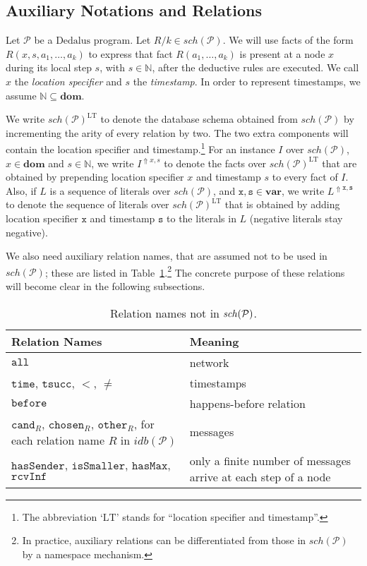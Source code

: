 \documentclass{tlp}
\newcommand{\langname}[1]{\text{#1}}  \newcommand{\pred}[1]{\mathtt{#1}}  \newcommand{\fname}[1]{\mathit{#1}}  \newcommand{\sq}[1]{`{#1}'}
\newcommand{\dedalus}{\langname{Dedalus}}
\newcommand{\Nat}{\mathbb{N}}  \newcommand{\len}[1]{|#1|} \newcommand{\rom}[1]{\text{\emph{(#1)}}} \newcommand{\romI}{\rom i}
\newcommand{\ded}{\mathcal{P}}
\newcommand{\rar}[2]{#1/#2}
\newcommand{\univ}{\mathbf{dom}}
\newcommand{\idb}[1]{\fname{idb}(#1)}
\newcommand{\schof}[1]{\fname{sch}(#1)}
\newcommand{\uvar}{\mathbf{var}}
\newcommand{\var}[1]{\mathtt{#1}}
\newcommand{\toloct}[1]{#1^{\mathrm{LT}}}
\newcommand{\addlt}[3]{#1^{\Uparrow#2,#3}}
\newcommand{\reltime}{\pred{time}}
\newcommand{\timesucc}{\pred{tsucc}}
\newcommand{\relall}{\pred{all}}
\newcommand{\before}{\pred{before}}
\newcommand{\chosen}{\pred{chosen}}
\newcommand{\other}{\pred{other}}
\newcommand{\cand}{\pred{cand}}
\newcommand{\rcvinf}{\pred{rcvInf}}
\newcommand{\issmaller}{\pred{isSmaller}}
\newcommand{\hasmax}{\pred{hasMax}}
\newcommand{\hassender}{\pred{hasSender}}
\begin{document}
\subsection{Auxiliary Notations and Relations}

\label{sub:pure-P-notations-and-relations}

Let $\ded$ be a $\dedalus$ program. Let $\rar Rk\in\schof{\ded}$.
We will use facts of the form $R(x,s,a_{1},\ldots,a_{k})$ to express that
fact $R(a_{1},\ldots,a_{k})$ is present at a node $x$ during its
local step $s$, with $s\in\Nat$, after the deductive rules are executed.
We call $x$ the \emph{location specifier} and $s$ the \emph{timestamp}.
In order to represent timestamps, we assume $\Nat\subseteq\univ$. 

We write $\toloct{\schof{\ded}}$ to denote the database schema obtained
from $\schof{\ded}$ by incrementing the arity of every relation by
two. The two extra components will contain the location specifier
and timestamp.\footnote{The abbreviation \sq{$\mathrm{LT}$} stands for ``location specifier
and timestamp''. } For an instance $I$ over $\schof{\ded}$, $x\in\univ$ and $s\in\Nat$,
we write $\addlt Ixs$ to denote the facts over $\toloct{\schof{\ded}}$
that are obtained by prepending location specifier $x$ and timestamp
$s$ to every fact of $I$. Also, if $L$ is a sequence of literals
over $\schof{\ded}$, and $\var x,\var s\in\uvar$, we write $\addlt L{\var x}{\var s}$
to denote the sequence of literals over $\toloct{\schof{\ded}}$ that
is obtained by adding location specifier $\var x$ and timestamp $\var s$
to the literals in $L$ (negative literals stay negative).

We also need auxiliary relation names, that are assumed not to be
used in $\schof{\ded}$; these are listed in Table~\ref{tab:relation-names}.\footnote{In practice, auxiliary relations can be differentiated from those
in $\schof{\ded}$ by a namespace mechanism.} The concrete purpose of these relations will become clear in the
following subsections.



\begin{table}

\caption{Relation names not in $\protect\schof{\protect\ded}$.}
\label{tab:relation-names}
\begin{centering}

\begin{tabular}{p{}|p{}}
\hline 
Relation Names & Meaning\tabularnewline
\hline 
\hline 
$\relall$ & network\tabularnewline
\hline 
$\reltime$, $\timesucc$, $<$, $\neq$ & timestamps\tabularnewline
\hline 
$\before$ & happens-before relation\tabularnewline
\hline 
$\cand_{R}$, $\chosen_{R}$, $\other_{R}$, for each relation name
$R$ in $\idb{\ded}$ & messages\tabularnewline
\hline 
$\hassender$, $\issmaller$, $\hasmax$, $\rcvinf$ & only a finite number of messages arrive at each step of a node\tabularnewline
\hline 
\end{tabular}

\end{centering}
\end{table}
\end{document}
